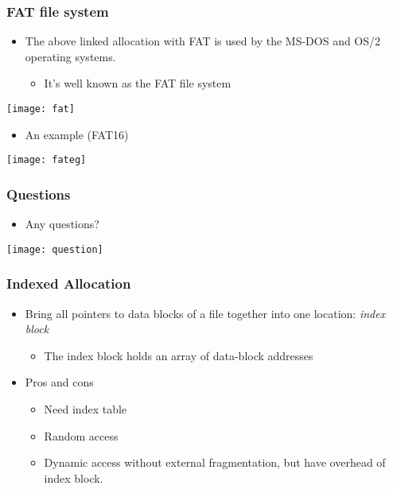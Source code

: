 \documentclass[CJKutf8,dvipsnames,table]{beamer}
\begin{document}
\begin{CJK*}{UTF8}{song}
  \begin{frame}
    \frametitle{FAT file system} \pause
    \begin{itemize}\parskip=0pt
    \item The above linked allocation with FAT is used by the MS-DOS and OS/2 operating systems. \pause
      \begin{itemize}\parskip=0pt
      \item It's well known as the FAT file system \pause
      \end{itemize}
    \end{itemize}
    \begin{center}
      \texttt{[image: fat]} \pause
    \end{center}
    \begin{itemize}\parskip=0pt
    \item An example (FAT16) \pause
    \end{itemize}
    \begin{center}
      \texttt{[image: fateg]}
    \end{center}
  \end{frame}
  
  \begin{frame}
    \frametitle{Questions}
    \begin{itemize}
    \item Any questions?
    \end{itemize}
    \begin{center}
      \texttt{[image: question]}
    \end{center}
  \end{frame}
  
  \begin{frame}
    \frametitle{Indexed Allocation} \pause
    \begin{itemize}\parskip=0pt
    \item Bring all pointers to data blocks of a file together into one location: \emph{index block} \pause
      \begin{itemize}\parskip=0pt
      \item The index block holds an array of data-block addresses \pause
      \end{itemize}
    \item Pros and cons \pause
      \begin{itemize}\parskip=0pt
      \item Need index table \pause
      \item Random access \pause
      \item Dynamic access without external fragmentation, but have overhead of index block.
      \end{itemize}
    \end{itemize}
  \end{frame}
  

\end{CJK*}
\end{document}
